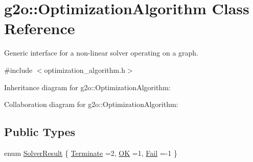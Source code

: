 \hypertarget{classg2o_1_1OptimizationAlgorithm}{}\section{g2o\+:\+:Optimization\+Algorithm Class Reference}
\label{classg2o_1_1OptimizationAlgorithm}


Generic interface for a non-\/linear solver operating on a graph.  




{\ttfamily \#include $<$optimization\+\_\+algorithm.\+h$>$}



Inheritance diagram for g2o\+:\+:Optimization\+Algorithm\+:


Collaboration diagram for g2o\+:\+:Optimization\+Algorithm\+:
\subsection*{Public Types}
\begin{DoxyCompactItemize}
\item 
enum \hyperlink{classg2o_1_1OptimizationAlgorithm_a705d58d7bc19528a8ab718570d090cdf}{Solver\+Result} \{ \hyperlink{classg2o_1_1OptimizationAlgorithm_a705d58d7bc19528a8ab718570d090cdfa3c3d3db3bae371ad18611e0ec5aa99ef}{Terminate} =2, 
\hyperlink{classg2o_1_1OptimizationAlgorithm_a705d58d7bc19528a8ab718570d090cdfa5e94b8ee7748cc4c1a5c86de2e8cc962}{OK} =1, 
\hyperlink{classg2o_1_1OptimizationAlgorithm_a705d58d7bc19528a8ab718570d090cdfa375598c3a146bb5116b5d19bb1a88f84}{Fail} =-\/1
 \}
\end{DoxyCompactItemize}
